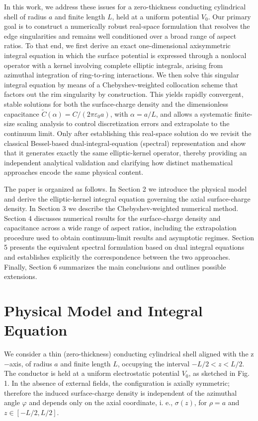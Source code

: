 \documentclass[12pt]{article}
\begin{document}
In this work, we address these issues for a zero-thickness conducting
cylindrical shell of radius $a$ and finite length $L$, held at a uniform
potential $V_{0}$. Our primary goal is to construct a numerically robust
real-space formulation that resolves the edge singularities and remains well
conditioned over a broad range of aspect ratios. To that end, we first derive
an exact one-dimensional axisymmetric integral equation in which the surface
potential is expressed through a nonlocal operator with a kernel involving
complete elliptic integrals, arising from azimuthal integration of
ring-to-ring interactions. We then solve this singular integral equation by
means of a Chebyshev-weighted collocation scheme that factors out the rim
singularity by construction. This yields rapidly convergent, stable solutions
for both the surface-charge density and the dimensionless capacitance
$\widetilde{C}(\alpha)=C/(2\pi\varepsilon_{0}a)$, with $\alpha=a/L$, and
allows a systematic finite-size scaling analysis to control discretization
errors and extrapolate to the continuum limit. Only after establishing this
real-space solution do we revisit the classical Bessel-based
dual-integral-equation (spectral) representation and show that it generates
exactly the same elliptic-kernel operator, thereby providing an independent
analytical validation and clarifying how distinct mathematical approaches
encode the same physical content\cite{c4}.

The paper is organized as follows. In Section 2 we introduce the physical
model and derive the elliptic-kernel integral equation governing the axial
surface-charge density. In Section 3 we describe the Chebyshev-weighted
numerical method. Section 4 discusses numerical results for the surface-charge
density and capacitance across a wide range of aspect ratios, including the
extrapolation procedure used to obtain continuum-limit results and asymptotic
regimes. Section 5 presents the equivalent spectral formulation based on dual
integral equations and establishes explicitly the correspondence between the
two approaches. Finally, Section 6 summarizes the main conclusions and
outlines possible extensions.

\section{Physical Model and Integral Equation}

We consider a thin (zero-thickness) conducting cylindrical shell aligned with
the z$-$axis, of radius $a$ and finite length $L$, occupying the interval
$-L/2<z<L/2$. The conductor is held at a uniform electrostatic potential
$V_{0}$, as sketched in Fig. 1. In the absence of external fields, the
configuration is axially symmetric; therefore the induced surface-charge
density is independent of the azimuthal angle $\varphi$ and depends only on
the axial coordinate, i. e., $\sigma(z)$, for $\rho=a$ and $z\in\left[
-L/2,L/2\right]  $.
\end{document}
